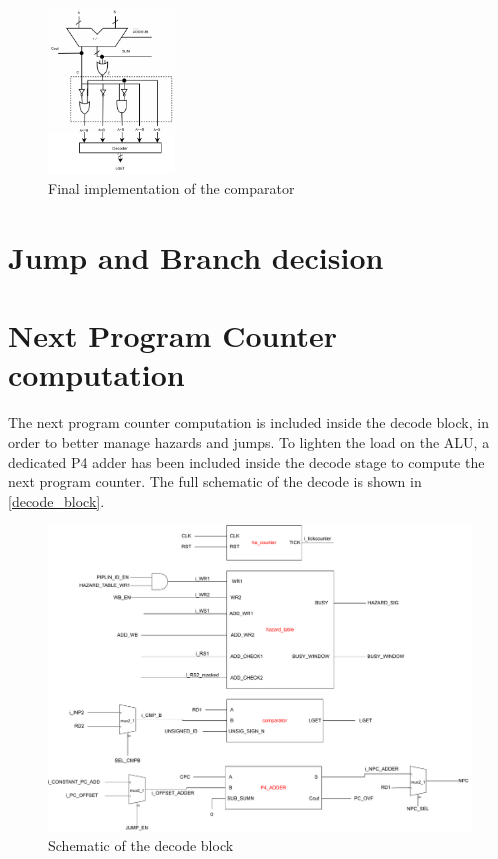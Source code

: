 \begin{figure}[H]
	\centering
	\includegraphics[width=0.3\textwidth]{chapters/4_DecodeStage/images/cmp_final.pdf}
	\caption{Final implementation of the comparator}
	\label{cmp_final}
\end{figure}

\section{Jump and Branch decision}
\section{Next Program Counter computation}
The next program counter computation is included inside the decode block, in order to better manage hazards and jumps. To lighten the load on the ALU, a dedicated P4 adder has been included inside the decode stage to compute the next program counter. 
The full schematic of the decode is shown in \autoref{decode_block}.

\begin{figure}[H]
	\centering
	\includegraphics[width=1\textwidth]{chapters/4_DecodeStage/images/decode_block.pdf}
	\caption{Schematic of the decode block}
	\label{decode_block}
\end{figure}

